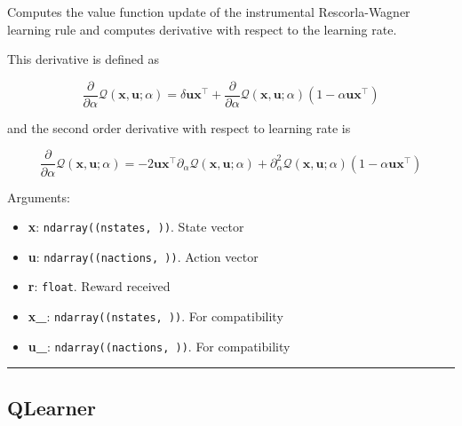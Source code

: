 \begin{Shaded}
\begin{Highlighting}[]
\end{Highlighting}
\end{Shaded}

Computes the value function update of the instrumental Rescorla-Wagner
learning rule and computes derivative with respect to the learning rate.

This derivative is defined as

\[
\frac{\partial}{\partial \alpha} \mathcal Q(\mathbf x, \mathbf u; \alpha) = \delta \mathbf u \mathbf x^\top + \frac{\partial}{\partial \alpha} \mathcal Q(\mathbf x, \mathbf u; \alpha) (1-\alpha \mathbf u \mathbf x^\top)
\]

and the second order derivative with respect to learning rate is

\[
\frac{\partial}{\partial \alpha} \mathcal Q(\mathbf x, \mathbf u; \alpha) = - 2 \mathbf u \mathbf x^\top \partial_\alpha \mathcal Q(\mathbf x, \mathbf u; \alpha) + \partial^2_\alpha \mathcal Q(\mathbf x, \mathbf u; \alpha) (1 - \alpha \mathbf u \mathbf x^\top)
\]

Arguments:

\begin{itemize}
\tightlist
\item
  \textbf{x}: \texttt{ndarray((nstates,\ ))}. State vector
\item
  \textbf{u}: \texttt{ndarray((nactions,\ ))}. Action vector
\item
  \textbf{r}: \texttt{float}. Reward received
\item
  \textbf{x\_}: \texttt{ndarray((nstates,\ ))}. For compatibility
\item
  \textbf{u\_}: \texttt{ndarray((nactions,\ ))}. For compatibility
\end{itemize}

\begin{center}\rule{0.5\linewidth}{\linethickness}\end{center}

\subsection{QLearner}\label{qlearner}

\begin{Shaded}
\begin{Highlighting}[]
\end{Highlighting}
\end{Shaded}

